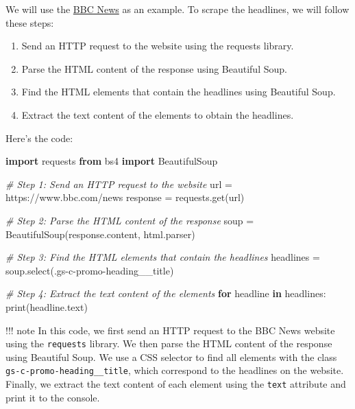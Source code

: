 \documentclass[
  paper=a4,
  ,captions=tableheading
]{scrartcl}
\newenvironment{Shaded}{}{}
\newcommand{\BuiltInTok}[1]{\textcolor[rgb]{0.00,0.50,0.00}{#1}}
\newcommand{\CommentTok}[1]{\textcolor[rgb]{0.38,0.63,0.69}{\textit{#1}}}
\newcommand{\ControlFlowTok}[1]{\textcolor[rgb]{0.00,0.44,0.13}{\textbf{#1}}}
\newcommand{\ImportTok}[1]{\textcolor[rgb]{0.00,0.50,0.00}{\textbf{#1}}}
\newcommand{\KeywordTok}[1]{\textcolor[rgb]{0.00,0.44,0.13}{\textbf{#1}}}
\newcommand{\NormalTok}[1]{#1}
\newcommand{\OperatorTok}[1]{\textcolor[rgb]{0.40,0.40,0.40}{#1}}
\newcommand{\StringTok}[1]{\textcolor[rgb]{0.25,0.44,0.63}{#1}}
\providecommand{\tightlist}{%
  \setlength{\itemsep}{0pt}\setlength{\parskip}{0pt}}
\begin{document}
We will use the \href{https://www.bbc.com/news}{BBC News} as an example.
To scrape the headlines, we will follow these steps:

\begin{enumerate}
\def\labelenumi{\arabic{enumi}.}
\tightlist
\item
  Send an HTTP request to the website using the requests library.
\item
  Parse the HTML content of the response using Beautiful Soup.
\item
  Find the HTML elements that contain the headlines using Beautiful
  Soup.
\item
  Extract the text content of the elements to obtain the headlines.
\end{enumerate}

Here's the code:

\begin{Shaded}
\begin{Highlighting}[]
\ImportTok{import}\NormalTok{ requests}
\ImportTok{from}\NormalTok{ bs4 }\ImportTok{import}\NormalTok{ BeautifulSoup}

\CommentTok{\# Step 1: Send an HTTP request to the website}
\NormalTok{url }\OperatorTok{=} \StringTok{\textquotesingle{}https://www.bbc.com/news\textquotesingle{}}
\NormalTok{response }\OperatorTok{=}\NormalTok{ requests.get(url)}

\CommentTok{\# Step 2: Parse the HTML content of the response}
\NormalTok{soup }\OperatorTok{=}\NormalTok{ BeautifulSoup(response.content, }\StringTok{\textquotesingle{}html.parser\textquotesingle{}}\NormalTok{)}

\CommentTok{\# Step 3: Find the HTML elements that contain the headlines}
\NormalTok{headlines }\OperatorTok{=}\NormalTok{ soup.select(}\StringTok{\textquotesingle{}.gs{-}c{-}promo{-}heading\_\_title\textquotesingle{}}\NormalTok{)}

\CommentTok{\# Step 4: Extract the text content of the elements}
\ControlFlowTok{for}\NormalTok{ headline }\KeywordTok{in}\NormalTok{ headlines:}
    \BuiltInTok{print}\NormalTok{(headline.text)}
\end{Highlighting}
\end{Shaded}

!!! note In this code, we first send an HTTP request to the BBC News
website using the \texttt{requests} library. We then parse the HTML
content of the response using Beautiful Soup. We use a CSS selector to
find all elements with the class \texttt{gs-c-promo-heading\_\_title},
which correspond to the headlines on the website. Finally, we extract
the text content of each element using the \texttt{text} attribute and
print it to the console.
\end{document}
